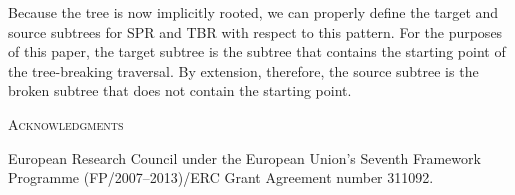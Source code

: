 \documentclass[12pt,letterpaper]{article}
\renewcommand{\section}[1]{%
\bigskip
\begin{center}
\begin{Large}
\normalfont\scshape #1
\medskip
\end{Large}
\end{center}}
\begin{document}
Because the tree is now implicitly rooted, we can properly define the target and source subtrees for SPR and TBR with respect to this pattern.
For the purposes of this paper, the target subtree is the subtree that contains the starting point of the tree-breaking traversal.
By extension, therefore, the source subtree is the broken subtree that does not contain the starting point.






\section{Acknowledgments}
European Research Council under the European Union’s Seventh Framework Programme (FP/2007–2013)/ERC Grant Agreement number 311092.






\end{document}
